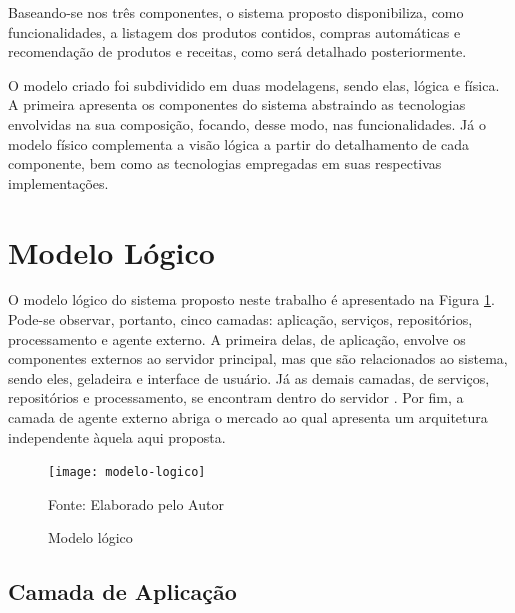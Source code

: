 Baseando-se nos três componentes, o sistema proposto disponibiliza, como funcionalidades, a listagem dos produtos contidos, compras automáticas e recomendação de produtos e receitas, como será detalhado posteriormente.
    
O modelo criado foi subdividido em duas modelagens, sendo elas, lógica e física. A primeira apresenta os componentes do sistema abstraindo as tecnologias envolvidas na sua composição, focando, desse modo, nas funcionalidades. Já o modelo físico complementa a visão lógica a partir do detalhamento de cada componente, bem como as tecnologias empregadas em suas respectivas implementações.

\section{Modelo Lógico}

O modelo lógico do sistema proposto neste trabalho é apresentado na Figura \ref{fig:c4_modelo_logico}. Pode-se observar, portanto, cinco camadas: aplicação, serviços, repositórios, processamento e agente externo. A primeira delas, de aplicação, envolve os componentes externos ao servidor principal, mas que são relacionados ao sistema, sendo eles, geladeira e interface de usuário. Já as demais camadas, de serviços, repositórios e processamento, se encontram dentro do servidor%
. Por fim, a camada de agente externo abriga o mercado ao qual apresenta um arquitetura independente àquela aqui proposta.


\begin{figure}[htb]
    \caption{Modelo lógico}
    \label{fig:c4_modelo_logico}
    \texttt{[image: modelo-logico]}
    
    \footnotesize{Fonte: Elaborado pelo Autor}
\end{figure}
\nocite{Freepik2017} %

\subsection{Camada de Aplicação}



